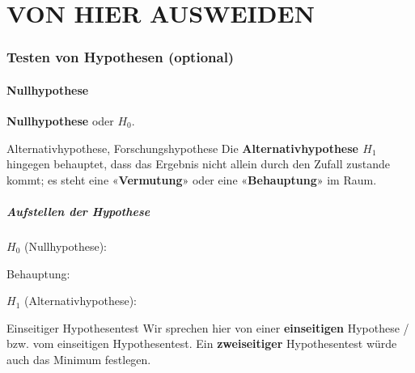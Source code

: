 
\part{VON HIER AUSWEIDEN}
\section{Testen von Hypothesen (optional)}


\subsection{Nullhypothese}

\begin{center}\textbf{Nullhypothese} oder {$H_0$}.\end{center}


\begin{definition}{Alternativhypothese, Forschungshypothese}{}
Die \textbf{Alternativhypothese $H_1$} hingegen behauptet, dass das
Ergebnis nicht allein durch den Zufall zustande kommt; es steht eine
«\textbf{Vermutung}» oder eine «\textbf{Behauptung}» im Raum. 
\end{definition}



\subsubsection*{Aufstellen der Hypothese}

\begin{center} $H_0$ (Nullhypothese):

\end{center}

Behauptung:

\begin{center} $H_1$ (Alternativhypothese):

\end{center}


\begin{bemerkung}{Einseitiger Hypothesentest}{}
  Wir sprechen hier von einer \textbf{einseitigen} Hypothese
/ bzw. vom einseitigen Hypothesentest. Ein \textbf{zweiseitiger}
Hypothesentest würde auch das Minimum festlegen.
\end{bemerkung}
\newpage


